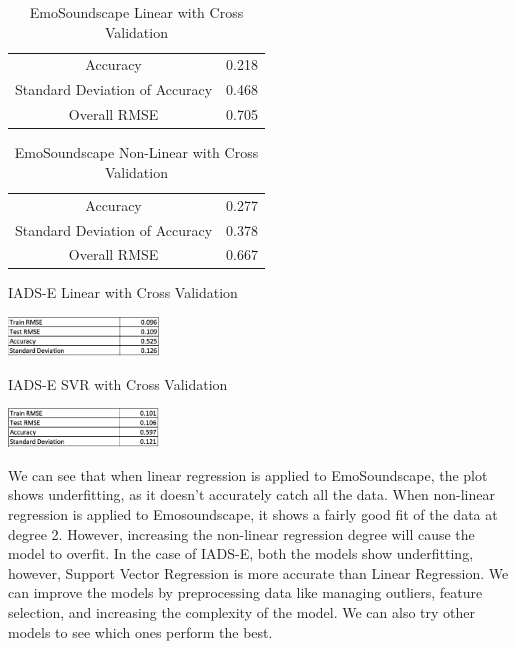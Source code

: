\documentclass[conference]{IEEEtran}
\begin{document}
{\begin{table}[h]
\caption{EmoSoundscape Linear with Cross Validation}
\begin{center}
\begin{tabular}{ |c|c| } 
 \hline
 Accuracy & 0.218 \\
 Standard Deviation of Accuracy & 0.468 \\
 Overall RMSE & 0.705 \\
 \hline
\end{tabular}
\end{center}
\label{tab:myTab}
\end{table}

\begin{table}[h]
\caption{EmoSoundscape Non-Linear with Cross Validation}
\begin{center}
\begin{tabular}{ |c|c| } 
 \hline
 Accuracy & 0.277 \\
 Standard Deviation of Accuracy & 0.378 \\
 Overall RMSE & 0.667 \\
 \hline
\end{tabular}
\end{center}
\label{tab:myTab}
\end{table}

\FloatBarrier

\begin{table}[h]
\caption{IADS-E Linear with Cross Validation}
\centering
\includegraphics[width=0.3\textwidth]{Figures/LR_Data.png}
\end{table}

\FloatBarrier

\begin{table}[h]
\caption{IADS-E SVR with Cross Validation}
\centering
\includegraphics[width=0.3\textwidth]{Figures/SVR_Data.png}
\end{table}

\FloatBarrier


\noindent
We can see that when linear regression is applied to EmoSoundscape, the plot shows underfitting, as it doesn't accurately catch all the data. When non-linear regression is applied to Emosoundscape, it shows a fairly good fit of the data at degree 2. However, increasing the non-linear regression degree will cause the model to overfit. In the case of IADS-E, both the models show underfitting, however, Support Vector Regression is more accurate than Linear Regression. We can improve the models by preprocessing data like managing outliers, feature selection, and increasing the complexity of the model. We can also try other models to see which ones perform the best.\\
}
\end{document}
